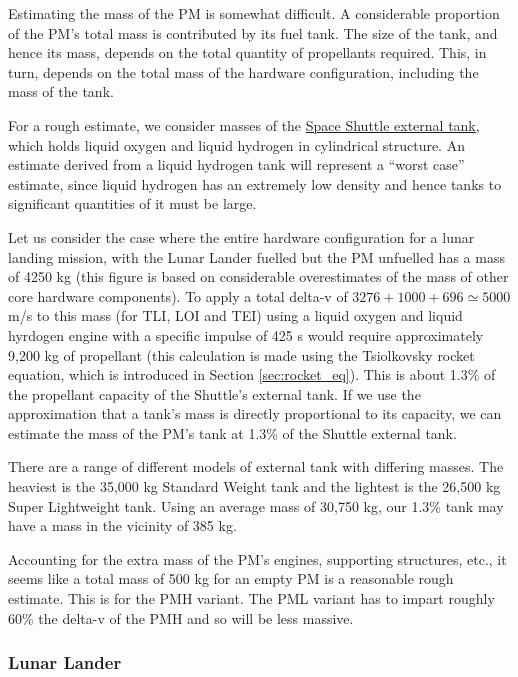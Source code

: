 \documentclass{report}
\begin{document}
Estimating the mass of the PM is somewhat difficult.  A considerable proportion of the PM's total mass is contributed by its fuel tank.  The size of the tank, and hence its mass, depends on the total quantity of propellants required.  This, in turn, depends on the total mass of the hardware configuration, including the mass of the tank.

For a rough estimate, we consider masses of the \href{http://en.wikipedia.org/wiki/Space_Shuttle_external_tank}{Space Shuttle external tank}, which holds liquid oxygen and liquid hydrogen in cylindrical structure.  An estimate derived from a liquid hydrogen tank will represent a ``worst case'' estimate, since liquid hydrogen has an extremely low density and hence tanks to significant quantities of it must be large.

Let us consider the case where the entire hardware configuration for a lunar landing mission, with the Lunar Lander fuelled but the PM unfuelled has a mass of 4250 kg (this figure is based on considerable overestimates of the mass of other core hardware components).  To apply a total delta-v of $3276 + 1000 + 696 \simeq 5000$ m/s to this mass (for TLI, LOI and TEI) using a liquid oxygen and liquid hyrdogen engine with a specific impulse of 425 s would require approximately 9,200 kg of propellant (this calculation is made using the Tsiolkovsky rocket equation, which is introduced in Section \ref{sec:rocket_eq}).  This is about 1.3\% of the propellant capacity of the Shuttle's external tank.  If we use the approximation that a tank's mass is directly proportional to its capacity, we can estimate the mass of the PM's tank at 1.3\% of the Shuttle external tank.

There are a range of different models of external tank with differing masses.  The heaviest is the 35,000 kg Standard Weight tank and the lightest is the 26,500 kg Super Lightweight tank.  Using an average mass of 30,750 kg, our 1.3\% tank may have a mass in the vicinity of 385 kg.

Accounting for the extra mass of the PM's engines, supporting structures, etc., it seems like a total mass of 500 kg for an empty PM is a reasonable rough estimate.  This is for the PMH variant.  The PML variant has to impart roughly 60\% the delta-v of the PMH and so will be less massive.

\subsubsection{Lunar Lander}
\end{document}

